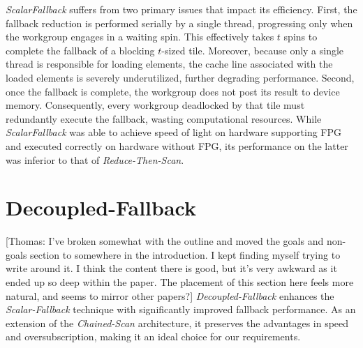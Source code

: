 \documentclass[sigconf]{acmart}
\newcommand{\thomas}[1]{{\footnotesize\color{orange}[Thomas: #1]}}
\begin{document}
\emph{ScalarFallback} suffers from two primary issues that impact its efficiency. First, the fallback reduction is performed serially by a single thread, progressing only when the workgroup engages in a waiting spin. This effectively takes $t$ spins to complete the fallback of a blocking $t$-sized tile. Moreover, because only a single thread is responsible for loading elements, the cache line associated with the loaded elements is severely underutilized, further degrading performance. Second, once the fallback is complete, the workgroup does not post its result to device memory. Consequently, every workgroup deadlocked by that tile must redundantly execute the fallback, wasting computational resources. While \emph{ScalarFallback} was able to achieve speed of light on hardware supporting FPG and executed correctly on hardware without FPG, its performance on the latter was inferior to that of \emph{Reduce-Then-Scan}.

\section{Decoupled-Fallback}
\thomas{I've broken somewhat with the outline and moved the goals and non-goals section to somewhere in the introduction. I kept finding myself trying to write around it. I think the content there is good, but it's very awkward as it ended up so deep within the paper. The placement of this section here feels more natural, and seems to mirror other papers?}
\emph{Decoupled-Fallback} enhances the \emph{Scalar-Fallback} technique with significantly improved fallback performance. As an extension of the \emph{Chained-Scan} architecture, it preserves the advantages in speed and oversubscription, making it an ideal choice for our requirements.
\end{document}
